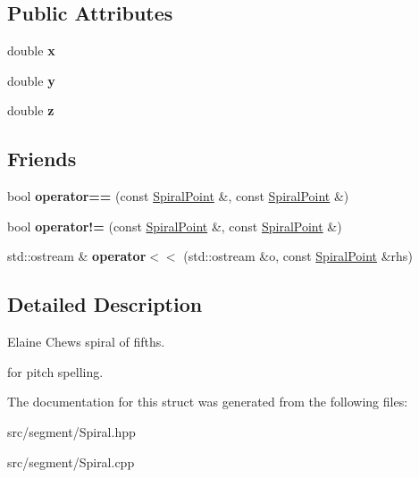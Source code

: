 \subsection*{Public Attributes}
\begin{DoxyCompactItemize}
\item 
\mbox{\label{structSpiralPoint_a68150be95db2b13f25312129c7ef96a5}} 
double {\bfseries x}
\item 
\mbox{\label{structSpiralPoint_aa969dcfbbeb0ce7b09d110ee93509da0}} 
double {\bfseries y}
\item 
\mbox{\label{structSpiralPoint_a97da96a3080f8aaaab29f35da17af415}} 
double {\bfseries z}
\end{DoxyCompactItemize}
\subsection*{Friends}
\begin{DoxyCompactItemize}
\item 
\mbox{\label{structSpiralPoint_ac21d75290af6313310910fa1a2e13552}} 
bool {\bfseries operator==} (const \mbox{\hyperlink{structSpiralPoint}{Spiral\+Point}} \&, const \mbox{\hyperlink{structSpiralPoint}{Spiral\+Point}} \&)
\item 
\mbox{\label{structSpiralPoint_af048917befb7b81ed301da6d53f00271}} 
bool {\bfseries operator!=} (const \mbox{\hyperlink{structSpiralPoint}{Spiral\+Point}} \&, const \mbox{\hyperlink{structSpiralPoint}{Spiral\+Point}} \&)
\item 
\mbox{\label{structSpiralPoint_ab3a698d42f743ce361da6916209eca88}} 
std\+::ostream \& {\bfseries operator$<$$<$} (std\+::ostream \&o, const \mbox{\hyperlink{structSpiralPoint}{Spiral\+Point}} \&rhs)
\end{DoxyCompactItemize}


\subsection{Detailed Description}
Elaine Chew\textquotesingle{}s spiral of fifths. 

for pitch spelling. 

The documentation for this struct was generated from the following files\+:\begin{DoxyCompactItemize}
\item 
src/segment/Spiral.\+hpp\item 
src/segment/Spiral.\+cpp\end{DoxyCompactItemize}

